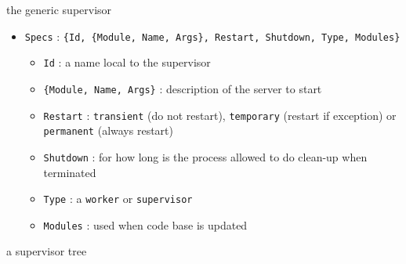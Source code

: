 \begin{frame}{the generic supervisor}

\pause\vspace{20pt}

\begin{itemize}
 \item {\tt Specs} : {\tt \{Id, \{Module, Name, Args\}, Restart, Shutdown, Type, Modules\}}
 \pause
 \begin{itemize}
  \item {\tt Id} : a name local to the supervisor
  \pause
  \item {\tt \{Module, Name, Args\}} : description of the server to start
  \pause
  \item {\tt Restart} : {\tt transient} (do not restart), {\tt temporary} (restart if exception) or {\tt permanent} (always restart)
  \pause
  \item {\tt Shutdown} : for how long is the process allowed to do clean-up when terminated
  \pause
  \item {\tt Type} : a {\tt worker} or {\tt supervisor} 
  \pause
  \item {\tt Modules} : used when code base is updated 
 \end{itemize}
\end{itemize}

\end{frame}

\begin{frame}{a supervisor tree}


\end{frame}

